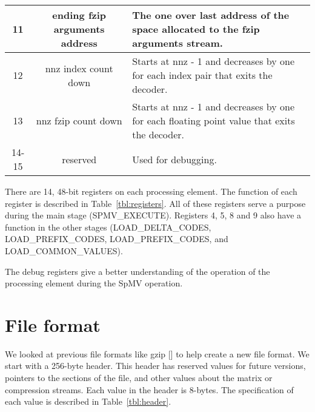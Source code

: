 \begin{table}
\begin{tabular}{|c|c|m{8cm}|}
        \hline
        11 & ending fzip arguments address & The one over last address of the space allocated to the fzip arguments stream.\\
        \hline
        12 & nnz index count down & Starts at nnz - 1 and decreases by one for each index pair that exits the decoder.\\
        \hline
        13 & nnz fzip count down & Starts at nnz - 1 and decreases by one for each floating point value that exits the decoder.\\
        \hline
        14-15 & reserved & Used for debugging.\\
        \hline
    \end{tabular}

\end{table}

There are 14, 48-bit registers on each processing element. The function of each register is described in Table~\ref{tbl:registers}. All of these registers serve a purpose during the main stage (SPMV\_EXECUTE). Registers 4, 5, 8 and 9 also have a function in the other stages (LOAD\_DELTA\_CODES, LOAD\_PREFIX\_CODES, LOAD\_PREFIX\_CODES, and LOAD\_COMMON\_VALUES).

The debug registers give a better understanding of the operation of the processing element during the SpMV operation.

\section{File format}
\label{sec:file_format}
We looked at previous file formats like gzip [\cite{prelim:deutsch}] to help create a new file format. We start with a 256-byte header. This header has reserved values for future versions, pointers to the sections of the file, and other values about the matrix or compression streams. Each value in the header is 8-bytes. The specification of each value is described in Table~\ref{tbl:header}.

